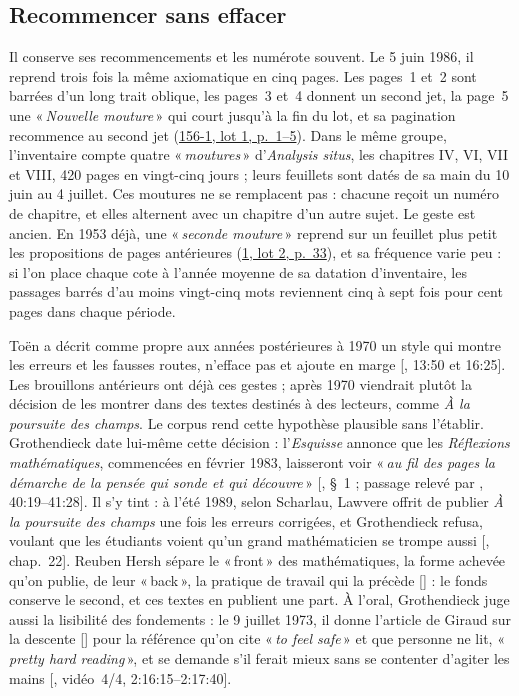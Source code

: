 \documentclass[11pt]{amsart}
\makeatletter
\newcommand{\ts}[1]{\foreignlanguage{english}{#1}}
\newcommand{\q}[1]{«\,\textit{#1}\,»}
\newcommand{\mot}[1]{«\,#1\,»}
\def\RHM@first#1--#2\@nil{#1}
\DeclareRobustCommand{\lot}[3]{\begingroup\edef\RHM@pdfpage{\the\numexpr\RHM@first#3--\@nil+1\relax}\href{https://grothendieck.umontpellier.fr/#1.pdf\#page=\RHM@pdfpage}{#1, lot #2, p.~#3}\endgroup}
\newcommand{\lot}[3]{\href{https://grothendieck.commutator.io/\##1/#2/p#3}{#1, lot #2, p.~#3}}
\makeatother
\begin{document}
\subsection{Recommencer sans effacer}

Il conserve ses recommencements et les numérote souvent. Le 5 juin 1986, il reprend trois fois la même axiomatique en cinq pages. Les pages~1 et~2 sont barrées d'un long trait oblique, les pages~3 et~4 donnent un second jet, la page~5 une \q{Nouvelle mouture} qui court jusqu'à la fin du lot, et sa pagination recommence au second jet (\lot{156-1}{1}{1--5}). Dans le même groupe, l'inventaire compte quatre \q{moutures} d'\emph{Analysis situs}, les chapitres IV, VI, VII et VIII, 420 pages en vingt-cinq jours ; leurs feuillets sont datés de sa main du 10 juin au 4 juillet. Ces moutures ne se remplacent pas : chacune reçoit un numéro de chapitre, et elles alternent avec un chapitre d'un autre sujet. Le geste est ancien. En 1953 déjà, une \q{seconde mouture} reprend sur un feuillet plus petit les propositions de pages antérieures (\lot{1}{2}{33}), et sa fréquence varie peu : si l'on place chaque cote à l'année moyenne de sa datation d'inventaire, les passages barrés d'au moins vingt-cinq mots reviennent cinq à sept fois pour cent pages dans chaque période.

Toën a décrit comme propre aux années postérieures à 1970 un style qui montre les erreurs et les fausses routes, n'efface pas et ajoute en marge [\citealp{toen2025}, \ts{13:50} et \ts{16:25}]. Les brouillons antérieurs ont déjà ces gestes ; après 1970 viendrait plutôt la décision de les montrer dans des textes destinés à des lecteurs, comme \emph{À la poursuite des champs}. Le corpus rend cette hypothèse plausible sans l'établir. Grothendieck date lui-même cette décision : l'\emph{Esquisse} annonce que les \emph{Réflexions mathématiques}, commencées en février 1983, laisseront voir \q{au fil des pages la démarche de la pensée qui sonde et qui découvre} [\citealp{grothendieck1997}, §~1 ; passage relevé par \citealp{malgoire2017a}, \ts{40:19--41:28}]. Il s'y tint : à l'été 1989, selon Scharlau, Lawvere offrit de publier \emph{À la poursuite des champs} une fois les erreurs corrigées, et Grothendieck refusa, voulant que les étudiants voient qu'un grand mathématicien se trompe aussi [\citealp{circle-spirit}, chap.~22]. Reuben Hersh sépare le \mot{\foreignlanguage{english}{front}} des mathématiques, la forme achevée qu'on publie, de leur \mot{\foreignlanguage{english}{back}}, la pratique de travail qui la précède [\citealp{hersh1991}] : le fonds conserve le second, et ces textes en publient une part. À l'oral, Grothendieck juge aussi la lisibilité des fondements : le 9 juillet 1973, il donne l'article de Giraud sur la descente [\citealp{giraud1964}] pour la référence qu'on cite \q{to feel safe} et que personne ne lit, \q{pretty hard reading}, et se demande s'il ferait mieux sans se contenter d'agiter les mains [\citealp{buffalo1973ag}, vidéo~4/4, \ts{2:16:15--2:17:40}].
\end{document}
